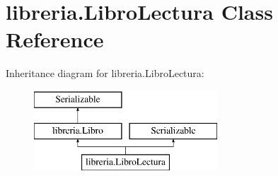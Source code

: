 \hypertarget{classlibreria_1_1_libro_lectura}{}\section{libreria.\+Libro\+Lectura Class Reference}
\label{classlibreria_1_1_libro_lectura}
Inheritance diagram for libreria.\+Libro\+Lectura\+:\begin{figure}[H]
\begin{center}
\leavevmode
\includegraphics[height=3.000000cm]{classlibreria_1_1_libro_lectura}
\end{center}
\end{figure}
